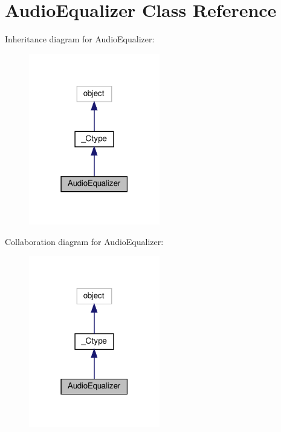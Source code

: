 \hypertarget{classvlc_1_1_audio_equalizer}{}\section{Audio\+Equalizer Class Reference}
\label{classvlc_1_1_audio_equalizer}


Inheritance diagram for Audio\+Equalizer\+:
\nopagebreak
\begin{figure}[H]
\begin{center}
\leavevmode
\includegraphics[width=162pt]{classvlc_1_1_audio_equalizer__inherit__graph}
\end{center}
\end{figure}


Collaboration diagram for Audio\+Equalizer\+:
\nopagebreak
\begin{figure}[H]
\begin{center}
\leavevmode
\includegraphics[width=162pt]{classvlc_1_1_audio_equalizer__coll__graph}
\end{center}
\end{figure}
